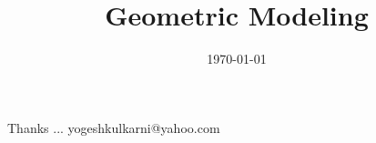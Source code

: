 \documentclass[t,pdf]{beamer}
\title[Intro to CAD \hspace{4cm} \insertframenumber /\inserttotalframenumber]{Geometric Modeling}
\subtitle[]{}
\date[2014]{\today}
\begin{document}
\begin{frame}
\titlepage
\end{frame}







\begin{frame}[c]{}
Thanks ...
\vspace{5mm}
yogeshkulkarni@yahoo.com
\end{frame}


\end{document}
